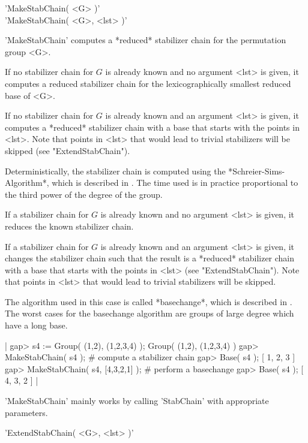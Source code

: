
'MakeStabChain( <G> )' \\
'MakeStabChain( <G>, <lst> )'

'MakeStabChain' computes a *reduced* stabilizer chain for the permutation
group <G>.

If no stabilizer  chain for $G$ is already known and no argument <lst> is
given,  it  computes a reduced stabilizer chain for the lexicographically
smallest reduced base of <G>.

If no stabilizer chain  for $G$ is already known and an argument <lst> is
given, it computes  a *reduced* stabilizer chain with  a base that starts
with the points in <lst>.  Note that  points in <lst>  that would lead to
trivial stabilizers will be skipped (see "ExtendStabChain").

Deterministically, the stabilizer  chain  is computed using  the 
*Schreier-Sims-Algorithm*, which  is  described  in  \cite{Leo80}.   The 
time used  is in  practice proportional to the third power of the degree
of the group.

If a stabilizer chain for  $G$ is already known and  no argument <lst> is
given, it reduces the known stabilizer chain.

If a stabilizer chain for $G$ is already known and  an argument <lst>  is
given,  it  changes  the stabilizer chain  such  that  the  result  is  a
*reduced* stabilizer chain with a  base that starts  with the  points  in
<lst> (see "ExtendStabChain").  Note that points in <lst> that would lead
to trivial stabilizers will be skipped.

The  algorithm  used  in  this  case is  called  *basechange*,  which  is
described in \cite{But82}.  The worst cases for  the basechange algorithm
are groups of large degree which have a long base.

|    gap> s4 := Group( (1,2), (1,2,3,4) );
    Group( (1,2), (1,2,3,4) )
    gap> MakeStabChain( s4 );    # compute a stabilizer chain
    gap> Base( s4 );
    [ 1, 2, 3 ]
    gap> MakeStabChain( s4, [4,3,2,1] );    # perform a basechange
    gap> Base( s4 );
    [ 4, 3, 2 ] |

'MakeStabChain' mainly works by calling 'StabChain' with appropriate
parameters.


'ExtendStabChain( <G>, <lst> )'

